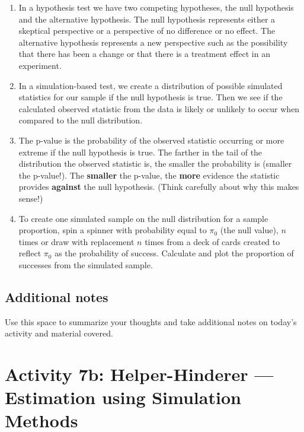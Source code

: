 \documentclass[
]{report}
\begin{document}
\begin{enumerate}
\def\labelenumi{\arabic{enumi}.}
\item
  In a hypothesis test we have two competing hypotheses, the null hypothesis and the alternative hypothesis. The null hypothesis represents either a skeptical perspective or a perspective of no difference or no effect. The alternative hypothesis represents a new perspective such as the possibility that there has been a change or that there is a treatment effect in an experiment.
\item
  In a simulation-based test, we create a distribution of possible simulated statistics for our sample if the null hypothesis is true. Then we see if the calculated observed statistic from the data is likely or unlikely to occur when compared to the null distribution.
\item
  The p-value is the probability of the observed statistic occurring or more extreme if the null hypothesis is true. The farther in the tail of the distribution the observed statistic is, the smaller the probability is (smaller the p-value!). The \textbf{smaller} the p-value, the \textbf{more} evidence the statistic provides \textbf{against} the null hypothesis. (Think carefully about why this makes sense!)
\item
  To create one simulated sample on the null distribution for a sample proportion, spin a spinner with probability equal to \(\pi_0\) (the null value), \(n\) times or draw with replacement \(n\) times from a deck of cards created to reflect \(\pi_0\) as the probability of success. Calculate and plot the proportion of successes from the simulated sample.
\end{enumerate}

\hypertarget{additional-notes-7}{%
\subsection{Additional notes}\label{additional-notes-7}}

Use this space to summarize your thoughts and take additional notes on today's activity and material covered.

\newpage

\hypertarget{activity-7b-helper-hinderer-estimation-using-simulation-methods}{%
\section{Activity 7b: Helper-Hinderer --- Estimation using Simulation Methods}\label{activity-7b-helper-hinderer-estimation-using-simulation-methods}}
\end{document}

